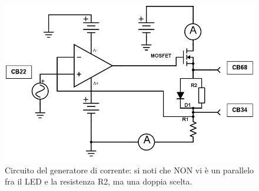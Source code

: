 \documentclass[journal, a4paper]{IEEEtran}
\begin{document}
\begin{figure}
\centering
\includegraphics[width=0.7\linewidth]{./WEEK08-ES12}
\caption{Circuito del generatore di corrente: si noti che NON vi è un parallelo fra il LED e la resistenza R2, ma una doppia scelta.}
\label{fig:WEEK08-ES12}
\end{figure}
\end{document}

